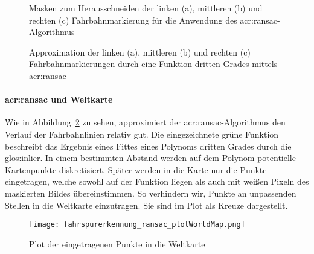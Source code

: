 \begin{figure}[H]
  \centering
  \quad
  \quad
  \caption{Masken zum Herausschneiden der linken (a), mittleren (b) und rechten (c) Fahrbahnmarkierung für die Anwendung des \gls{acr:ransac}-Algorithmus}
\label{fig:fahrspurerkennung_ransac_masken}
\end{figure} 

\begin{figure}[H]
  \centering
  \quad
  \quad
  \caption{Approximation der linken (a), mittleren (b) und rechten (c) Fahrbahnmarkierungen durch eine Funktion dritten Grades mittels \gls{acr:ransac}}
\label{fig:fahrspurerkennung_ransac_ransac}
\end{figure} 

\paragraph{\gls{acr:ransac} und Weltkarte} 
Wie in Abbildung~\ref{fig:fahrspurerkennung_ransac_ransac} zu sehen, approximiert der \gls{acr:ransac}-Algorithmus den Verlauf der Fahrbahnlinien relativ gut. Die eingezeichnete grüne Funktion beschreibt das Ergebnis eines Fittes eines Polynoms dritten Grades durch die \gls{glos:inlier}. In einem bestimmten Abstand werden auf dem Polynom potentielle Kartenpunkte diskretisiert. Später werden in die Karte nur die Punkte eingetragen, welche sowohl auf der Funktion liegen als auch mit weißen Pixeln des maskierten Bildes übereinstimmen. So verhindern wir, Punkte an unpassenden Stellen in die Weltkarte einzutragen. Sie sind im Plot als Kreuze dargestellt. 

\begin{figure}[H] %
  \centering
  \texttt{[image: fahrspurerkennung\_ransac\_plotWorldMap.png]}
  \caption{Plot der eingetragenen Punkte in die Weltkarte}
\label{fig:fahrspurerkennung_ransac_karte}
\end{figure} 

